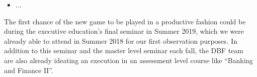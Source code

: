 \begin{itemize}
  \item ...
\end{itemize}

The first chance of the new game to be played in a productive fashion could be during the executive education's final seminar in Summer 2019, which we were already able to attend in Summer 2018 for our first observation purposes. In addition to this seminar and the master level seminar each fall, the DBF team are also already ideating an execution in an assessment level course like ``Banking and Finance II''.
